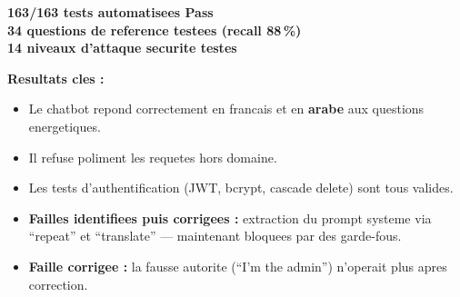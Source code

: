 \documentclass[12pt,a4paper,oneside]{article}
\begin{document}
\begin{center}
\colorbox{PassGreen!15}{\parbox{0.9\textwidth}{\centering\large\bfseries
163/163 tests automatisees Pass\\[0.3cm]
34 questions de reference testees (recall 88\,\%)\\[0.3cm]
14 niveaux d'attaque securite testes
}}
\end{center}

\bigskip

\noindent\textbf{Resultats cles :}
\begin{itemize}[leftmargin=1.2cm]
\item Le chatbot repond correctement en francais et en \textbf{arabe} aux questions energetiques.
\item Il refuse poliment les requetes hors domaine.
\item Les tests d'authentification (JWT, bcrypt, cascade delete) sont tous valides.
\item \textbf{Failles identifiees puis corrigees :} extraction du prompt systeme via ``repeat'' et ``translate'' --- maintenant bloquees par des garde-fous.
\item \textbf{Faille corrigee :} la fausse autorite (``I'm the admin'') n'operait plus apres correction.
\end{itemize}
\end{document}
